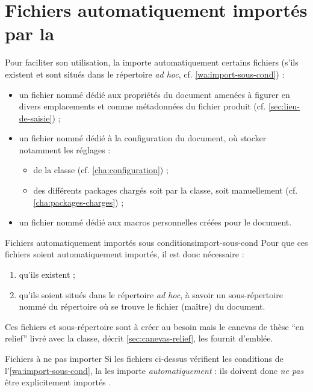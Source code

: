 \chapter{Fichiers automatiquement importés par la \yatcl{}}
\label{cha:fichiers-importes-par}

Pour faciliter son utilisation, la \yatcl{} importe automatiquement certains
fichiers (s'ils existent et sont situés dans le répertoire \emph{ad hoc},
cf. \vref{wa:import-sous-cond}) :
\begin{itemize}
\item un fichier nommé \file{\propertiesfile} dédié aux propriétés du document
  amenées à figurer en divers emplacements et comme métadonnées du fichier \pdf
  produit (cf. \vref{sec:lieu-de-saisie}) ;
\item un fichier nommé \file{\configurationfile} dédié à la configuration du
  document, où stocker notamment les réglages :
  \begin{itemize}
  \item de la classe \yatcl (cf. \vref{cha:configuration}) ;
  \item des différents packages chargés soit par la classe, soit manuellement
    (cf. \vref{cha:packages-charges}) ;
  \end{itemize}
\item un fichier nommé \file{\macrosfile} dédié aux macros personnelles créées
  pour le document.
\end{itemize}
\begin{dbwarning}{Fichiers automatiquement importés sous conditions}{import-sous-cond}
  Pour que ces fichiers soient automatiquement importés, il est donc
  nécessaire :
  \begin{enumerate}
  \item qu'ils existent ;
  \item qu'ils soient situés dans le répertoire \emph{ad hoc}, à savoir un
    sous-répertoire nommé \directory{\configurationdirectory} du répertoire où
    se trouve le fichier (maître) du document.
  \end{enumerate}
\end{dbwarning}
Ces fichiers et sous-répertoire sont à créer au besoin mais le canevas de thèse
\enquote{en relief} livré avec la classe, décrit \vref{sec:canevas-relief}, les
fournit d'emblée.
\begin{dbwarning}{Fichiers à ne pas importer}{}
  Si les fichiers ci-dessus vérifient les conditions de
  l'\vref{wa:import-sous-cond}, la \yatcl{} les importe
  \emph{automatiquement} : ils doivent donc \emph{ne pas} être explicitement
  importés .
\end{dbwarning}
